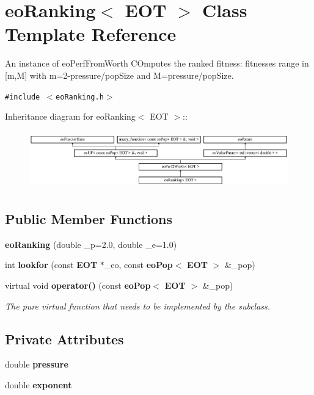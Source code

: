 \section{eo\-Ranking$<$ EOT $>$ Class Template Reference}
\label{classeo_ranking}
An instance of eo\-Perf\-From\-Worth COmputes the ranked fitness: fitnesses range in [m,M] with m=2-pressure/pop\-Size and M=pressure/pop\-Size.  


{\tt \#include $<$eo\-Ranking.h$>$}

Inheritance diagram for eo\-Ranking$<$ EOT $>$::\begin{figure}[H]
\begin{center}
\leavevmode
\includegraphics[height=2.52252cm]{classeo_ranking}
\end{center}
\end{figure}
\subsection*{Public Member Functions}
\begin{CompactItemize}
\item 
{\bf eo\-Ranking} (double \_\-p=2.0, double \_\-e=1.0)\label{classeo_ranking_a0}

\item 
int {\bf lookfor} (const {\bf EOT} $\ast$\_\-eo, const {\bf eo\-Pop}$<$ {\bf EOT} $>$ \&\_\-pop)\label{classeo_ranking_a1}

\item 
virtual void {\bf operator()} (const {\bf eo\-Pop}$<$ {\bf EOT} $>$ \&\_\-pop)\label{classeo_ranking_a2}

\begin{CompactList}\small\item\em The pure virtual function that needs to be implemented by the subclass. \item\end{CompactList}\end{CompactItemize}
\subsection*{Private Attributes}
\begin{CompactItemize}
\item 
double {\bf pressure}\label{classeo_ranking_r0}

\item 
double {\bf exponent}\label{classeo_ranking_r1}

\end{CompactItemize}


